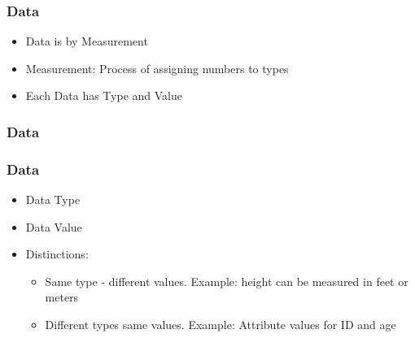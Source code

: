 \begin{frame}[fragile]\frametitle{Data}	

\begin{itemize}
\item Data is by Measurement
\item Measurement: Process of assigning numbers to types
\item Each Data has Type and Value
\end{itemize}
\end{frame}


\begin{frame}[fragile] \frametitle{Data}

\hfill
{}

\end{frame}


\begin{frame}[fragile]\frametitle{Data}	

\begin{itemize}
\item Data Type
\item Data Value
\item Distinctions:
	\begin{itemize}
	\item Same type - different values. Example: height can be measured in feet or meters
	\item Different types  same values. Example: Attribute values for ID and age 
	\end{itemize}
\end{itemize}
\end{frame}


